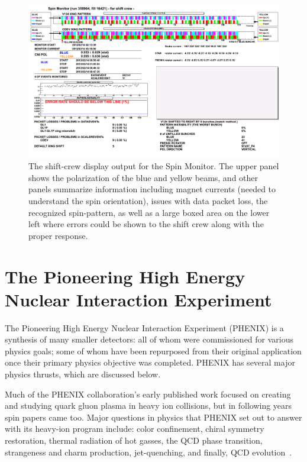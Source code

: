 \begin{figure}
  \centering
  \includegraphics[width=\linewidth]{./figures/SPINMON_shift_358904.png}
  \caption{
    The shift-crew display output for the Spin Monitor. The upper panel shows
    the polarization of the blue and yellow beams, and other panels summarize
    information including magnet currents (needed to understand the spin
    orientation), issues with data packet loss, the recognized spin-pattern, as
    well as a large boxed area on the lower left where errors could be shown to
    the shift crew along with the proper response.
  }
  \label{fig:spin_monitor}
\end{figure}

\clearpage
\section{The Pioneering High Energy Nuclear Interaction Experiment}
\label{sec:PHENIX}

The Pioneering High Energy Nuclear Interaction Experiment (PHENIX) is a
synthesis of many smaller detectors: all of whom were commissioned for various
physics goals; some of whom have been repurposed from their original application
once their primary physics objective was completed. PHENIX has several major
physics thrusts, which are discussed below. 

Much of the PHENIX collaboration's early published work focused on creating and
studying quark gluon plasma in heavy ion collisions, but in following years spin
papers came too. Major questions in physics that PHENIX set out to answer with
its heavy-ion program include: color confinement, chiral symmetry restoration,
thermal radiation of hot gasses, the QCD phase transition, strangeness and charm
production, jet-quenching, and finally, QCD evolution~\cite{Nagamiya1994}.

